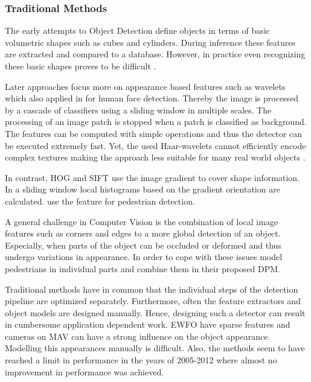 \subsubsection{Traditional Methods}

The early attempts to Object Detection define objects in terms of basic volumetric shapes such as cubes and cylinders. During inference these features are extracted and compared to a database. However, in practice even recognizing these basic shapes proves to be difficult \cite{Andreopoulos2013}. 

Later approaches focus more on appearance based features such as wavelets \cite{Papageorgiou} which also applied in \cite{Viola2004} for human face detection. Thereby the image is processed by a cascade of classifiers using a sliding window in multiple scales. The processing of an image patch is stopped when a patch is classified as background. The features can be computed with simple operations and thus the detector can be executed extremely fast. Yet, the used Haar-wavelets cannot efficiently encode complex textures making the approach less suitable for many real world objects \cite{Andreopoulos2013}. 

In contrast, \ac{HOG} \cite{Dalal} and \ac{SIFT} \cite{Lowe2004} use the image gradient to cover shape information. In a sliding window local histograms based on the gradient orientation are calculated. \citeauthor{Dalal} \cite{Dalal} use the feature for pedestrian detection.

A general challenge in Computer Vision is the combination of local image features such as corners and edges to a more global detection of an object. Especially, when parts of the object can be occluded or deformed and thus undergo variations in appearance. In order to cope with these issues \citeauthor{Felzenszwalb} \cite{Felzenszwalb} model pedestrians in individual parts and combine them in their proposed \ac{DPM}.

Traditional methods have in common that the individual steps of the detection pipeline are optimized separately. Furthermore, often the feature extractors and object models are designed manually. Hence, designing such a detector can result in cumbersome application dependent work. \ac{EWFO} have sparse features and cameras on \ac{MAV} can have a strong influence on the object appearance. Modelling this appearances manually is difficult. Also, the methods seem to have reached a limit in performance in the years of 2005-2012 where almost no improvement in performance was achieved.

